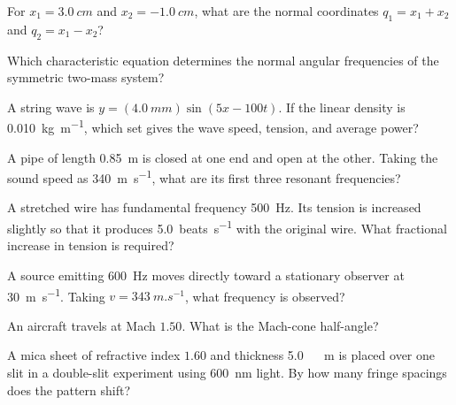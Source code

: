 \documentclass[10pt,a4paper]{physicsquiz}
\begin{document}
\begin{quizquestions}[2]
  \item For \(x_1=\SI{3.0}{cm}\) and \(x_2=\SI{-1.0}{cm}\), what are the normal coordinates \(q_1=x_1+x_2\) and \(q_2=x_1-x_2\)?
  \item Which characteristic equation determines the normal angular frequencies of the symmetric two-mass system?
  \item A string wave is \(y=(\SI{4.0}{mm})\sin(5x-100t)\). If the linear density is \SI{0.010}{kg.m^{-1}}, which set gives the wave speed, tension, and average power?
  \item A pipe of length \SI{0.85}{m} is closed at one end and open at the other. Taking the sound speed as \SI{340}{m.s^{-1}}, what are its first three resonant frequencies?
  \item A stretched wire has fundamental frequency \SI{500}{Hz}. Its tension is increased slightly so that it produces \SI{5.0}{beats.s^{-1}} with the original wire. What fractional increase in tension is required?
  \item A source emitting \SI{600}{Hz} moves directly toward a stationary observer at \SI{30}{m.s^{-1}}. Taking \(v=\SI{343}{m.s^{-1}}\), what frequency is observed?
  \item An aircraft travels at Mach \(1.50\). What is the Mach-cone half-angle?
  \item A mica sheet of refractive index \(1.60\) and thickness \SI{5.0}{\micro\,m} is placed over one slit in a double-slit experiment using \SI{600}{nm} light. By how many fringe spacings does the pattern shift?

\end{quizquestions}
\end{document}
